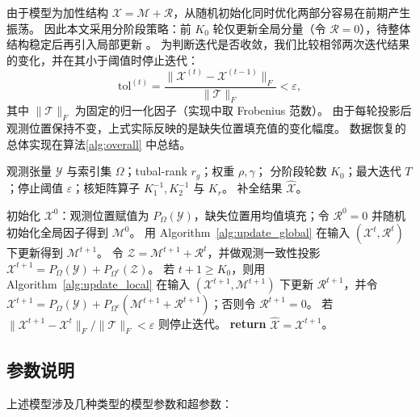 \documentclass[UTF8]{ctexart}
\begin{document}
由于模型为加性结构 $\mathcal{X}=\mathcal{M}+\mathcal{R}$，从随机初始化同时优化两部分容易在前期产生振荡。
因此本文采用分阶段策略：前 $K_0$ 轮仅更新全局分量（令 $\mathcal{R}=0$），待整体结构稳定后再引入局部更新 \cite{lei2024glskf}。
为判断迭代是否收敛，我们比较相邻两次迭代结果的变化，并在其小于阈值时停止迭代：
\begin{equation}
\mathrm{tol}^{(t)}=\frac{\|\mathcal{X}^{(t)}-\mathcal{X}^{(t-1)}\|_F}{\|\mathcal{T}\|_F}<\varepsilon,
\end{equation}
其中 $\|\mathcal{T}\|_F$ 为固定的归一化因子（实现中取 Frobenius 范数）。
由于每轮投影后观测位置保持不变，上式实际反映的是缺失位置填充值的变化幅度。
数据恢复的总体实现在算法\eqref{alg:overall} 中总结。

\begin{algorithm}[!htbp]
\caption{完整更新流程}
\label{alg:overall}
\begin{algorithmic}[1]
\Require 观测张量 $\mathcal{Y}$ 与索引集 $\Omega$；tubal-rank $r_g$；权重 $\rho,\gamma$；
分阶段轮数 $K_0$；最大迭代 $T$；停止阈值 $\varepsilon$；核矩阵算子 $K_1^{-1},K_2^{-1}$ 与 $K_r$。
\Ensure 补全结果 $\widehat{\mathcal{X}}$。

\State 初始化 $\mathcal{X}^{0}$：观测位置赋值为 $P_{\Omega}(\mathcal{Y})$，缺失位置用均值填充；令 $\mathcal{R}^{0}=0$ 并随机初始化全局因子得到 $\mathcal{M}^{0}$。
    \State 用 Algorithm~\ref{alg:update_global} 在输入 $(\mathcal{X}^{t},\mathcal{R}^{t})$ 下更新得到 $\mathcal{M}^{t+1}$。
    \State 令 $\mathcal{Z}=\mathcal{M}^{t+1}+\mathcal{R}^{t}$，并做观测一致性投影 $\mathcal{X}^{t+1}=P_{\Omega}(\mathcal{Y})+P_{\Omega^c}(\mathcal{Z})$。
    \State 若 $t+1\ge K_0$，则用 Algorithm~\ref{alg:update_local} 在输入 $(\mathcal{X}^{t+1},\mathcal{M}^{t+1})$ 下更新 $\mathcal{R}^{t+1}$，并令 $\mathcal{X}^{t+1}=P_{\Omega}(\mathcal{Y})+P_{\Omega^c}(\mathcal{M}^{t+1}+\mathcal{R}^{t+1})$；否则令 $\mathcal{R}^{t+1}=0$。
    \State 若 $\|\mathcal{X}^{t+1}-\mathcal{X}^{t}\|_F/\|\mathcal{T}\|_F<\varepsilon$ 则停止迭代。
\EndFor
\State \textbf{return} $\widehat{\mathcal{X}}=\mathcal{X}^{t+1}$。
\end{algorithmic}
\end{algorithm}

\subsection{参数说明}
\label{sec:params}

上述模型涉及几种类型的模型参数和超参数：
\end{document}
